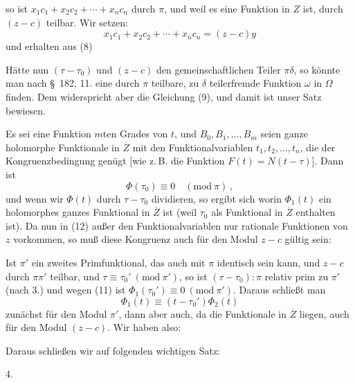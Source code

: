 so ist $x_1c_1 + x_2c_2 + \cdots + x_nc_n$ durch $\pi$, und weil es eine
Funktion in $Z$ ist, durch $(z - c)$ teilbar. Wir setzen:
\[
x_1c_1 + x_2c_2 + \cdots + x_nc_n = (z - c)y
\]
und erhalten aus (8)

Hätte nun $(\tau - \tau_0)$ und $(z - c)$ den gemeinschaftlichen Teiler
$\pi\delta$, so könnte man nach \S\ 182, 11. eine durch $\pi$ teilbare, zu $\delta$
teilerfremde Funktion $\omega$ in $\Omega$ finden. Dem widerspricht aber die
Gleichung (9), und damit ist unser Satz bewiesen.

Es sei
eine Funktion $m$ten Grades von $t$, und $B_0, B_1, \ldots, B_m$ seien ganze
holomorphe Funktionale in $\overline{Z}$ mit den Funktionalvariablen $t_1,
t_2, \ldots, t_n$, die der Kongruenzbedingung
genügt [wie z.\,B. die Funktion $F(t) = N(t - \tau)$]. Dann ist
\[
\Phi(\tau_0) \equiv 0 \quad (\mathrm{mod}\ \pi)\,,
\]
und wenn wir $\Phi(t)$ durch $\tau - \tau_0$ dividieren, so ergibt sich
worin $\Phi_1(t)$ ein holomorphes ganzes Funktional in $\overline{Z}$ ist (weil
$\tau_0$ als  Funktional in $\overline{Z}$ enthalten ist). Da nun in (12)
außer den Funktionalvariablen nur rationale Funktionen von $z$
vorkommen, so muß diese Kongruenz auch für den Modul $z - c$
gültig sein:

Ist $\pi'$ ein zweites Primfunktional, das auch mit $\pi$ identisch
sein kann, und $z - c$ durch $\pi\pi'$ teilbar, und $\tau \equiv \tau_0' \ (\mathrm{mod}\ \pi')$,
so ist $(\tau - \tau_0)\!: \pi$ relativ prim zu $\pi'$ (nach 3.) und wegen (11)
ist $\Phi_1(\tau_0') \equiv 0 \ (\mathrm{mod}\ \pi')$. Daraus schließt man
\[
\Phi_1(t) \equiv (t - \tau_0')\Phi_2(t)
\]
zunächst für den Modul $\pi'$, dann aber auch, da die Funktionale
in $\overline{Z}$ liegen, auch für den Modul $(z - c)$. Wir haben also:

Daraus schließen wir auf folgenden wichtigen Satz:

4. 
